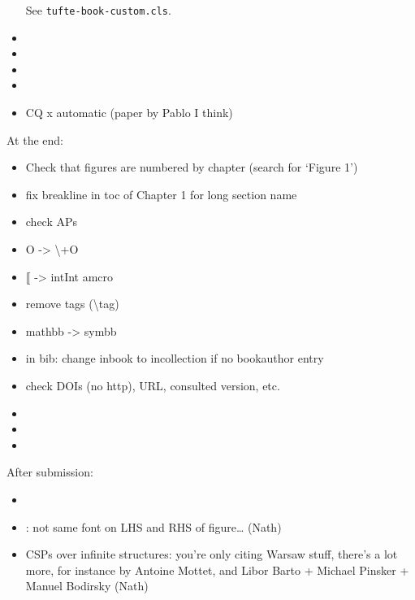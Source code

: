 \begin{itemize}
		See \texttt{tufte-book-custom.cls}.
	\item {}
	\item {}
	\item {}
	\item {}
	\item CQ x automatic (paper by Pablo I think)
\end{itemize}

At the end:
\begin{itemize}
	\item Check that figures are numbered by chapter (search for `Figure 1')
	\item fix breakline in toc of Chapter 1 for long section name
	\item check APs 
	\item O -> \backslash+O
	\item $\lBrack$ -> intInt amcro
	\item remove tags (\textsf{\backslash tag})
	\item mathbb -> symbb
	\item in bib: change inbook to incollection if no bookauthor entry
	\item check DOIs (no http), URL, consulted version, etc.
	\item {}
	\item {}
	\item {}
\end{itemize}

After submission:
\begin{itemize}
	\item {}
	\item {}: not same font on LHS and RHS of figure… (Nath)
	\item CSPs over infinite structures: you're only citing Warsaw stuff, there's a lot more, for instance by Antoine Mottet, and Libor Barto + Michael Pinsker + Manuel Bodirsky (Nath)
\end{itemize}